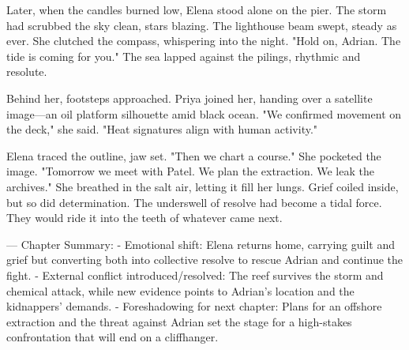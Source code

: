 Later, when the candles burned low, Elena stood alone on the pier. The storm had scrubbed the sky clean, stars blazing. The lighthouse beam swept, steady as ever. She clutched the compass, whispering into the night. "Hold on, Adrian. The tide is coming for you." The sea lapped against the pilings, rhythmic and resolute.

Behind her, footsteps approached. Priya joined her, handing over a satellite image—an oil platform silhouette amid black ocean. "We confirmed movement on the deck," she said. "Heat signatures align with human activity."

Elena traced the outline, jaw set. "Then we chart a course." She pocketed the image. "Tomorrow we meet with Patel. We plan the extraction. We leak the archives." She breathed in the salt air, letting it fill her lungs. Grief coiled inside, but so did determination. The underswell of resolve had become a tidal force. They would ride it into the teeth of whatever came next.

\bigskip

---
Chapter Summary:
- Emotional shift: Elena returns home, carrying guilt and grief but converting both into collective resolve to rescue Adrian and continue the fight.
- External conflict introduced/resolved: The reef survives the storm and chemical attack, while new evidence points to Adrian's location and the kidnappers' demands.
- Foreshadowing for next chapter: Plans for an offshore extraction and the threat against Adrian set the stage for a high-stakes confrontation that will end on a cliffhanger.
